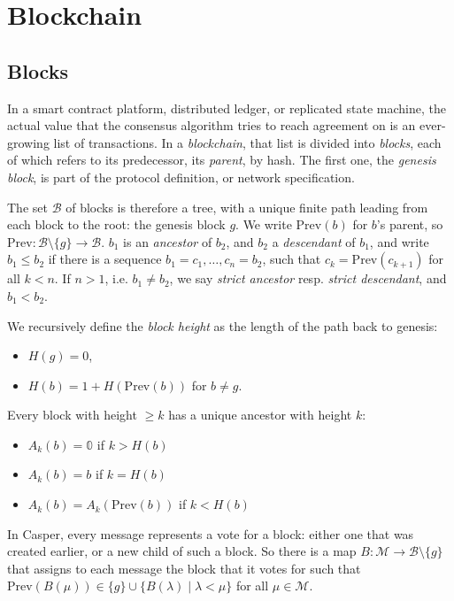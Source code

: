 \documentclass[12pt, fleqn]{article}
\begin{document}
\section{Blockchain}
\label{sectionBlockchain}


\subsection{Blocks}

In a smart contract platform, distributed ledger, or replicated state machine, the actual value that the consensus algorithm tries to reach agreement on is an ever-growing list of transactions. In a \emph{blockchain}, that list is divided into \emph{blocks}, each of which refers to its predecessor, its \emph{parent}, by hash. The first one, the \emph{genesis block}, is part of the protocol definition, or network specification.

The set $\mathcal{B}$ of blocks is therefore a tree, with a unique finite path leading from each block to the root: the genesis block $g$. We write $\mathrm{Prev}(b)$ for $b$'s parent, so $\mathrm{Prev} : \mathcal{B} \setminus \{g\} \rightarrow \mathcal{B}$. $b_1$ is an \emph{ancestor} of $b_2$, and $b_2$ a \emph{descendant} of $b_1$, and write $b_1 \leq b_2$ if there is a sequence $b_1 = c_1, \ldots, c_n = b_2$, such that $c_k = \mathrm{Prev}(c_{k+1})$ for all $k < n$. If $n > 1$, i.e. $b_1 \neq b_2$, we say \emph{strict ancestor} resp. \emph{strict descendant}, and $b_1 < b_2$.

We recursively define the \emph{block height} as the length of the path back to genesis:
\begin{itemize}
    \item $H(g) = 0$,
    \item $H(b) = 1 + H(\mathrm{Prev}(b))$ for $b \neq g$.
\end{itemize}
Every block with height $\geq k$ has a unique ancestor with height $k$:
\begin{itemize}
    \item $A_k(b) = \mathbb{0}$ if $k > H(b)$
    \item $A_k(b) = b$ if $k = H(b)$
    \item $A_k(b) = A_k(\mathrm{Prev}(b))$ if $k < H(b)$
\end{itemize}

In Casper, every message represents a vote for a block: either one that was created earlier, or a new child of such a block. So there is a map $B : \mathcal{M} \rightarrow \mathcal{B} \setminus \{g\}$ that assigns to each message the block that it votes for such that $\mathrm{Prev}(B(\mu)) \in \{g\} \cup \{ B(\lambda) \mid \lambda < \mu\}$ for all $\mu \in \mathcal{M}$.
\end{document}
